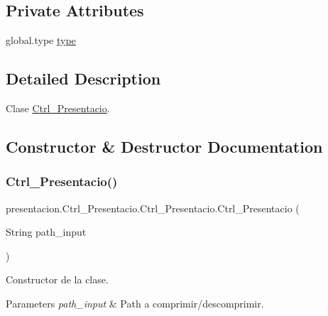 \subsection*{Private Attributes}
\begin{DoxyCompactItemize}
\item 
global.\+type \hyperlink{classpresentacion_1_1Ctrl__Presentacio_1_1Ctrl__Presentacio_af72267ee1302df6b5982c3248d5a19b0}{type}
\end{DoxyCompactItemize}


\subsection{Detailed Description}
Clase \hyperlink{classpresentacion_1_1Ctrl__Presentacio_1_1Ctrl__Presentacio}{Ctrl\+\_\+\+Presentacio}. 

\subsection{Constructor \& Destructor Documentation}
\mbox{\label{classpresentacion_1_1Ctrl__Presentacio_1_1Ctrl__Presentacio_a3d3ac2a3c4b9fa715bb631fdf3a955dd}} 
\subsubsection{\texorpdfstring{Ctrl\+\_\+\+Presentacio()}{Ctrl\_Presentacio()}}
{\footnotesize\ttfamily presentacion.\+Ctrl\+\_\+\+Presentacio.\+Ctrl\+\_\+\+Presentacio.\+Ctrl\+\_\+\+Presentacio (\begin{DoxyParamCaption}\item[{String}]{path\+\_\+input }\end{DoxyParamCaption})\hspace{0.3cm}{\ttfamily [inline]}}



Constructor de la clase. 


\begin{DoxyParams}{Parameters}
{\em path\+\_\+input} & Path a comprimir/descomprimir. \\
\hline
\end{DoxyParams}

